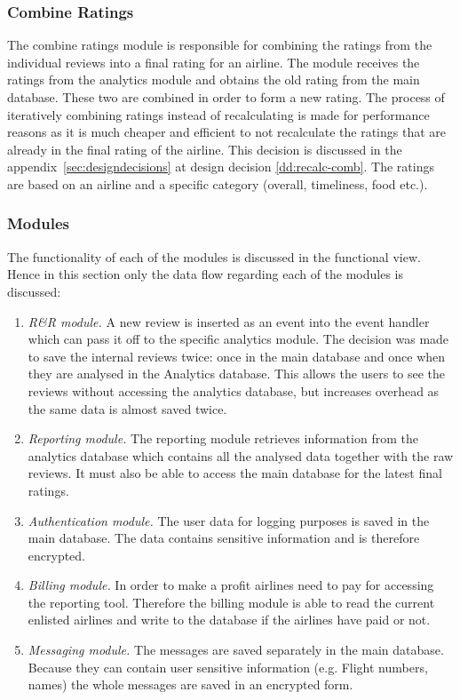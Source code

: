 \subsubsection{Combine Ratings}
The combine ratings module is responsible for combining the ratings from the individual reviews into a final rating for an airline. The module receives the ratings from the analytics module and obtains the old rating from the main database. These two are combined in order to form a new rating. The process of iteratively combining ratings instead of recalculating is made for performance reasons as it is much cheaper and efficient to not recalculate the ratings that are already in the final rating of the airline. This decision is discussed in the appendix~\ref{sec:designdecisions} at design decision \ref{dd:recalc-comb}. The ratings are based on an airline and a specific category (overall, timeliness, food etc.).

\subsubsection{Modules}
The functionality of each of the modules is discussed in the functional view. Hence in this section only the data flow regarding each of the modules is discussed:

\begin{enumerate}
\item \emph{R\&R module.} A new review is inserted as an event into the event handler which can pass it off to the specific analytics module. The decision was made to save the internal reviews twice: once in the main database and once when they are analysed in the Analytics database. This allows the users to see the reviews without accessing the analytics database, but increases overhead as the same data is almost saved twice.
\item \emph{Reporting module.} The reporting module retrieves information from the analytics database which contains all the analysed data together with the raw reviews. It must also be able to access the main database for the latest final ratings.
\item \emph{Authentication module.} The user data for logging purposes is saved in the main database. The data contains sensitive information and is therefore encrypted.
\item \emph{Billing module.} In order to make a profit airlines need to pay for accessing the reporting tool. Therefore the billing module is able to read the current enlisted airlines and write to the database if the airlines have paid or not.
\item \emph{Messaging module.} The messages are saved separately in the main database. Because they can contain user sensitive information (e.g. Flight numbers, names) the whole messages are saved in an encrypted form.
\end{enumerate}
